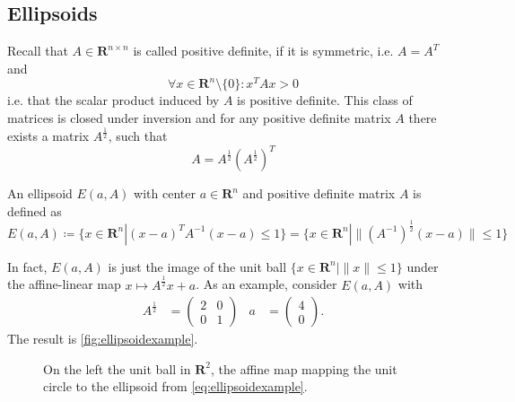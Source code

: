 \documentclass[10pt]{article}
\newcommand{\R}{\mathbf{R}}
\newcommand{\transpose}{T}
\begin{document}
\subsection{Ellipsoids}
Recall that $A \in \R^{n \times n}$ is called positive definite, if it is symmetric, i.e. $A = A^\transpose$ and 
\[
\forall x \in \R^n\setminus \{0\} \colon x^\transpose A x > 0
\]
i.e. that the scalar product induced by $A$ is positive definite. This class of matrices is closed under inversion and for any positive definite matrix $A$ there exists a matrix $A^{\frac{1}{2}}$, such that
\[
A = A^{\frac{1}{2}} (A^{\frac{1}{2}})^\transpose
\]
\begin{definition}[Ellipsoid]
An ellipsoid $E(a,A)$ with center $a \in \R^n$ and positive definite matrix $A$ is defined as
\[
E(a,A) \coloneqq \{x \in \R^n | (x-a)^{\transpose} A^{-1} (x-a) \le 1 \} = \{x \in \R^n | \| (A^{-1})^\frac{1}{2} (x-a) \| \le 1 \}
\]
\end{definition}
In fact, $E(a,A)$ is just the image of the unit ball $\{x\in \R^n | \|x\|\le 1\}$ under the affine-linear map $x \mapsto A^{\frac{1}{2}} x + a$. As an example, consider $E(a,A)$ with 
\begin{align}
A^{\frac{1}{2}} &= \begin{pmatrix} 2 & 0 \\ 0 & 1 \end{pmatrix} & a &= \begin{pmatrix} 4 \\ 0 \end{pmatrix}. \label{eq:ellipsoidexample}
\end{align}
The result is \autoref{fig:ellipsoidexample}.
\begin{figure}
\centering
{}
\caption{On the left the unit ball in $\R^2$, the affine map mapping the unit circle to the ellipsoid from \protect\autoref{eq:ellipsoidexample}.}
\label{fig:ellipsoidexample}
\end{figure}
\end{document}
